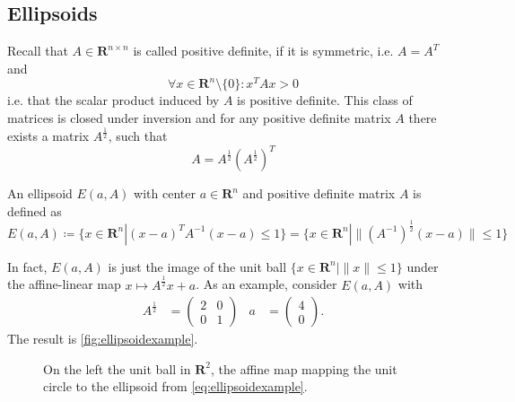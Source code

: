 \documentclass[10pt]{article}
\newcommand{\R}{\mathbf{R}}
\newcommand{\transpose}{T}
\begin{document}
\subsection{Ellipsoids}
Recall that $A \in \R^{n \times n}$ is called positive definite, if it is symmetric, i.e. $A = A^\transpose$ and 
\[
\forall x \in \R^n\setminus \{0\} \colon x^\transpose A x > 0
\]
i.e. that the scalar product induced by $A$ is positive definite. This class of matrices is closed under inversion and for any positive definite matrix $A$ there exists a matrix $A^{\frac{1}{2}}$, such that
\[
A = A^{\frac{1}{2}} (A^{\frac{1}{2}})^\transpose
\]
\begin{definition}[Ellipsoid]
An ellipsoid $E(a,A)$ with center $a \in \R^n$ and positive definite matrix $A$ is defined as
\[
E(a,A) \coloneqq \{x \in \R^n | (x-a)^{\transpose} A^{-1} (x-a) \le 1 \} = \{x \in \R^n | \| (A^{-1})^\frac{1}{2} (x-a) \| \le 1 \}
\]
\end{definition}
In fact, $E(a,A)$ is just the image of the unit ball $\{x\in \R^n | \|x\|\le 1\}$ under the affine-linear map $x \mapsto A^{\frac{1}{2}} x + a$. As an example, consider $E(a,A)$ with 
\begin{align}
A^{\frac{1}{2}} &= \begin{pmatrix} 2 & 0 \\ 0 & 1 \end{pmatrix} & a &= \begin{pmatrix} 4 \\ 0 \end{pmatrix}. \label{eq:ellipsoidexample}
\end{align}
The result is \autoref{fig:ellipsoidexample}.
\begin{figure}
\centering
{}
\caption{On the left the unit ball in $\R^2$, the affine map mapping the unit circle to the ellipsoid from \protect\autoref{eq:ellipsoidexample}.}
\label{fig:ellipsoidexample}
\end{figure}
\end{document}
